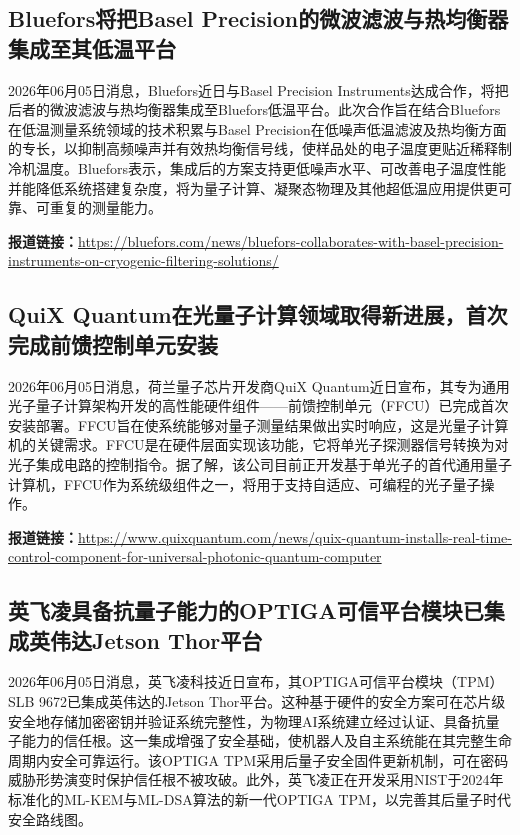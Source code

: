 \documentclass[12pt,a4paper]{ctexart}
\begin{document}
\subsection{ Bluefors将把Basel Precision的微波滤波与热均衡器集成至其低温平台 }

2026年06月05日消息，Bluefors近日与Basel Precision Instruments达成合作，将把后者的微波滤波与热均衡器集成至Bluefors低温平台。此次合作旨在结合Bluefors在低温测量系统领域的技术积累与Basel Precision在低噪声低温滤波及热均衡方面的专长，以抑制高频噪声并有效热均衡信号线，使样品处的电子温度更贴近稀释制冷机温度。Bluefors表示，集成后的方案支持更低噪声水平、可改善电子温度性能并能降低系统搭建复杂度，将为量子计算、凝聚态物理及其他超低温应用提供更可靠、可重复的测量能力。

\noindent\textbf{报道链接：}\url{https://bluefors.com/news/bluefors-collaborates-with-basel-precision-instruments-on-cryogenic-filtering-solutions/}

\subsection{ QuiX Quantum在光量子计算领域取得新进展，首次完成前馈控制单元安装 }

2026年06月05日消息，荷兰量子芯片开发商QuiX Quantum近日宣布，其专为通用光子量子计算架构开发的高性能硬件组件——前馈控制单元（FFCU）已完成首次安装部署。FFCU旨在使系统能够对量子测量结果做出实时响应，这是光量子计算机的关键需求。FFCU是在硬件层面实现该功能，它将单光子探测器信号转换为对光子集成电路的控制指令。据了解，该公司目前正开发基于单光子的首代通用量子计算机，FFCU作为系统级组件之一，将用于支持自适应、可编程的光子量子操作。

\noindent\textbf{报道链接：}\url{https://www.quixquantum.com/news/quix-quantum-installs-real-time-control-component-for-universal-photonic-quantum-computer}

\subsection{ 英飞凌具备抗量子能力的OPTIGA可信平台模块已集成英伟达Jetson Thor平台 }

2026年06月05日消息，英飞凌科技近日宣布，其OPTIGA可信平台模块（TPM）SLB 9672已集成英伟达的Jetson Thor平台。这种基于硬件的安全方案可在芯片级安全地存储加密密钥并验证系统完整性，为物理AI系统建立经过认证、具备抗量子能力的信任根。这一集成增强了安全基础，使机器人及自主系统能在其完整生命周期内安全可靠运行。该OPTIGA TPM采用后量子安全固件更新机制，可在密码威胁形势演变时保护信任根不被攻破。此外，英飞凌正在开发采用NIST于2024年标准化的ML-KEM与ML-DSA算法的新一代OPTIGA TPM，以完善其后量子时代安全路线图。
\end{document}
